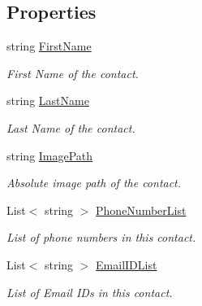 \subsection*{Properties}
\begin{DoxyCompactItemize}
\item 
string \hyperlink{class_voxel_busters_1_1_native_plugins_1_1_address_book_contact_a46bbdda148e2dc15aaa4ffb8d0015430}{First\+Name}
\begin{DoxyCompactList}\small\item\em First Name of the contact. \end{DoxyCompactList}\item 
string \hyperlink{class_voxel_busters_1_1_native_plugins_1_1_address_book_contact_afe43a1e86c660582c37e3b84039ca83c}{Last\+Name}
\begin{DoxyCompactList}\small\item\em Last Name of the contact. \end{DoxyCompactList}\item 
string \hyperlink{class_voxel_busters_1_1_native_plugins_1_1_address_book_contact_ad3eaaa2080aad3470dce85656e011ed9}{Image\+Path}
\begin{DoxyCompactList}\small\item\em Absolute image path of the contact. \end{DoxyCompactList}\item 
List$<$ string $>$ \hyperlink{class_voxel_busters_1_1_native_plugins_1_1_address_book_contact_a10e2edd4d7358f326d18c45a76805cc2}{Phone\+Number\+List}
\begin{DoxyCompactList}\small\item\em List of phone numbers in this contact. \end{DoxyCompactList}\item 
List$<$ string $>$ \hyperlink{class_voxel_busters_1_1_native_plugins_1_1_address_book_contact_a2e7fa1b601f13706722ab0d5811bc7b5}{Email\+I\+D\+List}
\begin{DoxyCompactList}\small\item\em List of Email I\+D\textquotesingle{}s in this contact. \end{DoxyCompactList}\end{DoxyCompactItemize}


